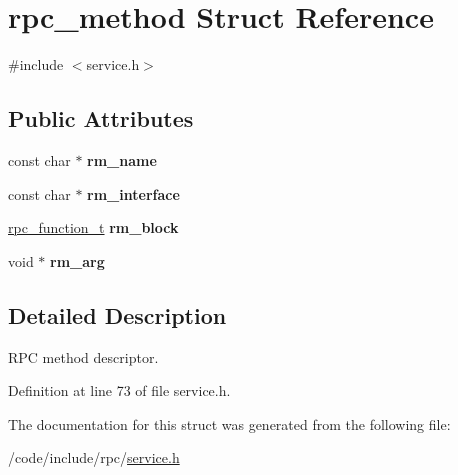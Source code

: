 \hypertarget{structrpc__method}{}\section{rpc\+\_\+method Struct Reference}
\label{structrpc__method}


{\ttfamily \#include $<$service.\+h$>$}

\subsection*{Public Attributes}
\begin{DoxyCompactItemize}
\item 
const char $\ast$ {\bfseries rm\+\_\+name}\hypertarget{structrpc__method_abeff7db58d8903e9e6827d4acac7a8a0}{}\label{structrpc__method_abeff7db58d8903e9e6827d4acac7a8a0}

\item 
const char $\ast$ {\bfseries rm\+\_\+interface}\hypertarget{structrpc__method_ad16d04d88d239e7412260ba948d88f7e}{}\label{structrpc__method_ad16d04d88d239e7412260ba948d88f7e}

\item 
\hyperlink{service_8h_a02d3dbd723de9bd5140887c9935ff05a}{rpc\+\_\+function\+\_\+t} {\bfseries rm\+\_\+block}\hypertarget{structrpc__method_ad6f2db7ebb8d4747730d4cb25b0c6824}{}\label{structrpc__method_ad6f2db7ebb8d4747730d4cb25b0c6824}

\item 
void $\ast$ {\bfseries rm\+\_\+arg}\hypertarget{structrpc__method_afc4708084618f0879e54efda3292cf8c}{}\label{structrpc__method_afc4708084618f0879e54efda3292cf8c}

\end{DoxyCompactItemize}


\subsection{Detailed Description}
R\+PC method descriptor. 

Definition at line 73 of file service.\+h.



The documentation for this struct was generated from the following file\+:\begin{DoxyCompactItemize}
\item 
/code/include/rpc/\hyperlink{service_8h}{service.\+h}\end{DoxyCompactItemize}
